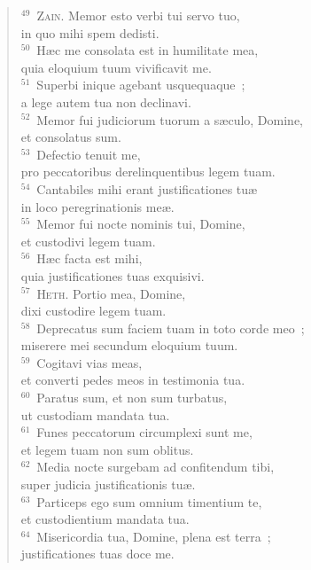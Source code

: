 \begin{flushleft}
\begin{verse}
${}^{49}$~\textsc{Zain.} Memor esto verbi tui servo tuo,\\ in quo mihi spem dedisti.\\
${}^{50}$~H\ae c me consolata est in humilitate mea,\\ quia eloquium tuum vivificavit me.\\
${}^{51}$~Superbi inique agebant usquequaque~;\\ a lege autem tua non declinavi.\\
${}^{52}$~Memor fui judiciorum tuorum a s\ae culo, Domine,\\ et consolatus sum.\\
${}^{53}$~Defectio tenuit me,\\ pro peccatoribus derelinquentibus legem tuam.\\
${}^{54}$~Cantabiles mihi erant justificationes tu\ae \\ in loco peregrinationis me\ae .\\
${}^{55}$~Memor fui nocte nominis tui, Domine,\\ et custodivi legem tuam.\\
${}^{56}$~H\ae c facta est mihi,\\ quia justificationes tuas exquisivi.\\
${}^{57}$~\textsc{Heth.} Portio mea, Domine,\\ dixi custodire legem tuam.\\
${}^{58}$~Deprecatus sum faciem tuam in toto corde meo~;\\ miserere mei secundum eloquium tuum.\\
${}^{59}$~Cogitavi vias meas,\\ et converti pedes meos in testimonia tua.\\
${}^{60}$~Paratus sum, et non sum turbatus,\\ ut custodiam mandata tua.\\
${}^{61}$~Funes peccatorum circumplexi sunt me,\\ et legem tuam non sum oblitus.\\
${}^{62}$~Media nocte surgebam ad confitendum tibi,\\ super judicia justificationis tu\ae .\\
${}^{63}$~Particeps ego sum omnium timentium te,\\ et custodientium mandata tua.\\
${}^{64}$~Misericordia tua, Domine, plena est terra~;\\ justificationes tuas doce me.\\

\end{verse}
\end{flushleft}
